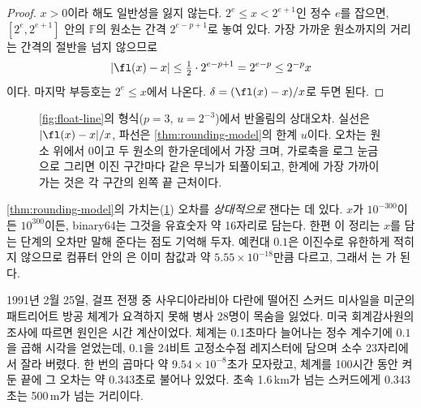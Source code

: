 \begin{proof}
$x>0$이라 해도 일반성을 잃지 않는다. $2^{e}\le x<2^{e+1}$인 정수 $e$를 잡으면, $[2^{e},2^{e+1}]$ 안의 $\mathbb{F}$의 원소는 간격 $2^{e-p+1}$로 놓여 있다. 가장 가까운 원소까지의 거리는 간격의 절반을 넘지 않으므로
\[
|\fl(x)-x|\le\tfrac12\cdot2^{e-p+1}=2^{e-p}\le 2^{-p}x
\]
이다. 마지막 부등호는 $2^{e}\le x$에서 나온다. $\delta=(\fl(x)-x)/x$로 두면 된다.
\end{proof}

\begin{figure}[t]
\centering
{}
\caption{\cref{fig:float-line}의 형식($p=3$, $u=2^{-3}$)에서 반올림의 상대오차. 실선은 $|\fl(x)-x|/x$, 파선은 \cref{thm:rounding-model}의 한계 $u$이다. 오차는 원소 위에서 $0$이고 두 원소의 한가운데에서 가장 크며, 가로축을 로그 눈금으로 그리면 이진 구간마다 같은 무늬가 되풀이되고, 한계에 가장 가까이 가는 것은 각 구간의 왼쪽 끝 근처이다.}
\label{fig:relerr}
\end{figure}

\cref{thm:rounding-model}의 가치는(\cref{fig:relerr}) 오차를 \emph{상대적으로} 잰다는 데 있다. $x$가 $10^{-300}$이든 $10^{300}$이든, binary64는 그것을 유효숫자 약 16자리로 담는다. 한편 이 정리는 $x$를 담는 단계의 오차만 말해 준다는 점도 기억해 두자. 예컨대 $0.1$은 이진수로 유한하게 적히지 않으므로 컴퓨터 안의 은 이미 참값과 약 $5.55\times10^{-18}$만큼 다르고, 그래서 는 가 된다.

\begin{aside}
1991년 2월 25일, 걸프 전쟁 중 사우디아라비아 다란에 떨어진 스커드 미사일을 미군의 패트리어트 방공 체계가 요격하지 못해 병사 28명이 목숨을 잃었다. 미국 회계감사원의 조사에 따르면 원인은 시간 계산이었다. 체계는 0.1초마다 늘어나는 정수 계수기에 $0.1$을 곱해 시각을 얻었는데, $0.1$을 24비트 고정소수점 레지스터에 담으며 소수 23자리에서 잘라 버렸다. 한 번의 곱마다 약 $9.54\times10^{-8}$초가 모자랐고, 체계를 100시간 동안 켜 둔 끝에 그 오차는 약 0.343초로 불어나 있었다. 초속 1.6\,km가 넘는 스커드에게 0.343초는 500\,m가 넘는 거리이다.
\end{aside}


